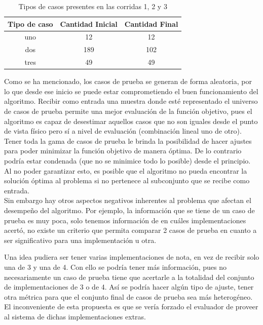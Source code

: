 \documentclass[a4paper,12pt]{book}
\begin{document}
 	
 	\begin{table}[t]
 		\begin{center}
 			\begin{tabular}{| c | c | c |} \hline
 				Tipo de caso & Cantidad Inicial & Cantidad Final \\ \hline
 				uno & 12 & 12 \\
 				dos & 189 & 102 \\
 				tres & 49 & 49 \\ \hline
 			\end{tabular}
 			\caption{Tipos de casos presentes en las corridas 1, 2 y 3}
 			\label{tab:Tiposdecasos123}
 		\end{center}
 	\end{table}
 
 	
	Como se ha mencionado, los casos de prueba se generan de forma aleatoria, por lo que desde ese inicio se puede estar comprometiendo el buen funcionamiento del algoritmo. Recibir como entrada una muestra donde esté representado el universo de casos de prueba permite una mejor evaluación de la función objetivo, pues el algoritmo es capaz de desestimar aquellos casos que no son iguales desde el punto de vista físico pero sí a nivel de evaluación (combinación lineal uno de otro). Tener toda la gama de casos de prueba le brinda la posibilidad de hacer ajustes para poder minimizar la función objetivo de manera óptima. De lo contrario podría estar condenada (que no se minimice todo lo posible) desde el principio. Al no poder garantizar esto, es posible que el algoritmo no pueda encontrar la solución óptima al problema si no pertenece al subconjunto que se recibe como entrada. \\
	
	Sin embargo hay otros aspectos negativos inherentes al problema que afectan el desempeño del algoritmo. Por ejemplo, la información que se tiene de un caso de prueba es muy poca, solo tenemos información de en cuáles implementaciones acertó, no existe un criterio que permita comparar 2 casos de prueba en cuanto a ser significativo para una implementación u otra.
	
	Una idea pudiera ser tener varias implementaciones de nota, en vez de recibir solo una de 3 y una de 4. Con ello se podría tener más información, pues no necesariamente un caso de prueba tiene que acertarle a la totalidad del conjunto de implementaciones de 3 o de 4. Así se podría hacer algún tipo de ajuste, tener otra métrica para que el conjunto final de casos de prueba sea más heterogéneo. El inconveniente de esta propuesta es que se vería forzado el evaluador de proveer al sistema de dichas implementaciones extras.
	
\end{document}
